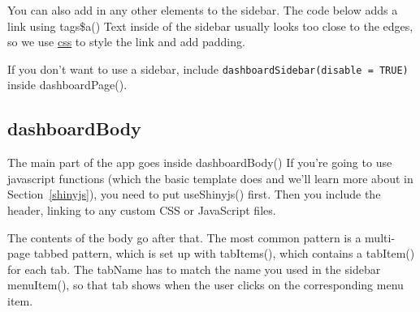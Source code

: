 \documentclass[
]{book}
\newenvironment{Shaded}{\begin{snugshade}}{\end{snugshade}}
\newcommand{\AttributeTok}[1]{\textcolor[rgb]{0.77,0.63,0.00}{#1}}
\newcommand{\FunctionTok}[1]{\textcolor[rgb]{0.00,0.00,0.00}{#1}}
\newcommand{\NormalTok}[1]{#1}
\newcommand{\SpecialCharTok}[1]{\textcolor[rgb]{0.00,0.00,0.00}{#1}}
\newcommand{\StringTok}[1]{\textcolor[rgb]{0.31,0.60,0.02}{#1}}
\begin{document}
You can also add in any other elements to the sidebar. The code below adds a link using tags\$a() Text inside of the sidebar usually looks too close to the edges, so we use \protect\hyperlink{CSS}{css} to style the link and add padding.

\begin{Shaded}
\end{Shaded}

If you don't want to use a sidebar, include \texttt{dashboardSidebar(disable\ =\ TRUE)} inside dashboardPage().

\hypertarget{dashboardbody}{%
\subsection{dashboardBody}\label{dashboardbody}}

The main part of the app goes inside dashboardBody() If you're going to use javascript functions (which the basic template does and we'll learn more about in Section~\ref{shinyjs}), you need to put useShinyjs() first. Then you include the header, linking to any custom CSS or JavaScript files.

The contents of the body go after that. The most common pattern is a multi-page tabbed pattern, which is set up with tabItems(), which contains a tabItem() for each tab. The tabName has to match the name you used in the sidebar menuItem(), so that tab shows when the user clicks on the corresponding menu item.
\end{document}
